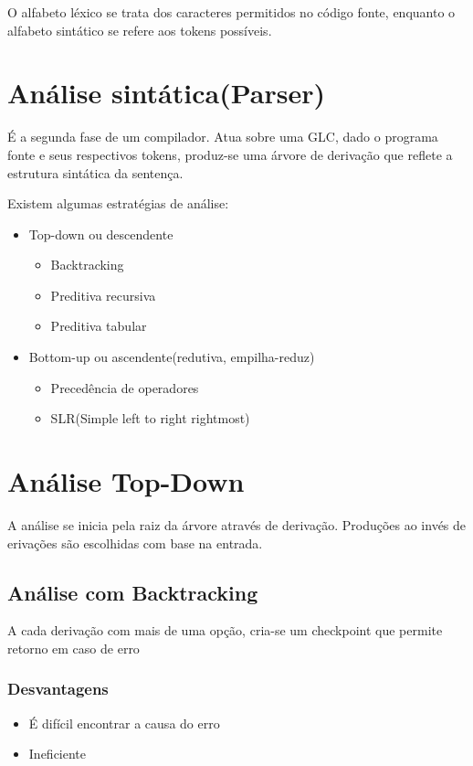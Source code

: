 \documentclass[11pt]{article}
\begin{document}
O alfabeto léxico se trata dos caracteres permitidos no código fonte,
enquanto o alfabeto sintático se refere aos tokens possíveis.

\section{Análise sintática(Parser)}
\label{sec:orgfe88b1a}
É a segunda fase de um compilador. Atua sobre uma GLC, dado o
programa fonte e seus respectivos tokens, produz-se uma árvore de
derivação que reflete a estrutura sintática da sentença.

Existem algumas estratégias de análise:
\begin{itemize}
\item Top-down  ou descendente
\begin{itemize}
\item Backtracking
\item Preditiva recursiva
\item Preditiva tabular
\end{itemize}
\item Bottom-up ou ascendente(redutiva, empilha-reduz)
\begin{itemize}
\item Precedência de operadores
\item SLR(Simple left to right rightmost)
\end{itemize}
\end{itemize}


\section{Análise Top-Down}
\label{sec:org64cfc39}
A análise se inicia pela raiz da árvore através de
derivação. Produções ao invés de erivações são escolhidas com base
na entrada.

\subsection{Análise com Backtracking}
\label{sec:orgd311655}
A cada derivação com mais de uma opção, cria-se um checkpoint que
permite retorno em caso de erro

\subsubsection{Desvantagens}
\label{sec:org9153f67}
\begin{itemize}
\item É difícil encontrar a causa do erro
\item Ineficiente
\end{itemize}
\end{document}
